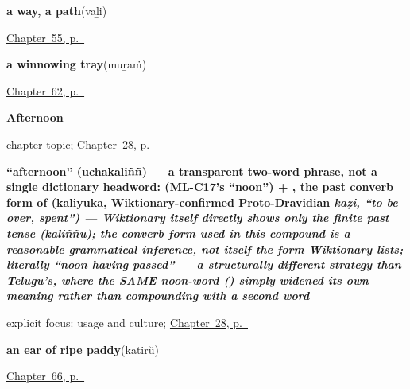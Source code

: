 \noindent\begin{minipage}[t]{\linewidth}
\raggedright
\textbf{a way, a path}\enspace\emph{}\enspace(vaḻi)\par
\footnotesize \hyperref[ch:ml-ground-underfoot]{Chapter~55, p.~\pageref*{ch:ml-ground-underfoot}}
\end{minipage}\par\smallskip

\noindent\begin{minipage}[t]{\linewidth}
\raggedright
\textbf{a winnowing tray}\enspace\emph{}\enspace(muṟaṁ)\par
\footnotesize \hyperref[ch:ml-made-by-hand]{Chapter~62, p.~\pageref*{ch:ml-made-by-hand}}
\end{minipage}\par\smallskip

\noindent\begin{minipage}[t]{\linewidth}
\raggedright
\textbf{Afternoon}\par
\footnotesize chapter topic; \hyperref[ch:ml-afternoon]{Chapter~28, p.~\pageref*{ch:ml-afternoon}}
\end{minipage}\par\smallskip

\noindent\begin{minipage}[t]{\linewidth}
\raggedright
\textbf{\textquotedblleft{}afternoon\textquotedblright{} (uchakaḻiññ) — a transparent two-word phrase, not a single dictionary headword:  (ML-C17's \textquotedblleft{}noon\textquotedblright{}) + , the past converb form of  (kaḻiyuka, Wiktionary-confirmed Proto-Dravidian \emph{kaẓi, \textquotedblleft{}to be over, spent\textquotedblright{}) — Wiktionary itself directly shows only the finite past tense  (kaḻiññu); the converb form used in this compound is a reasonable grammatical inference, not itself the form Wiktionary lists; literally \textquotedblleft{}noon having passed\textquotedblright{} — a structurally different strategy than Telugu's, where the SAME noon-word () simply widened its own meaning rather than compounding with a second word}}\enspace\emph{}\par
\footnotesize explicit focus: usage and culture; \hyperref[ch:ml-afternoon]{Chapter~28, p.~\pageref*{ch:ml-afternoon}}
\end{minipage}\par\smallskip

\noindent\begin{minipage}[t]{\linewidth}
\raggedright
\textbf{an ear of ripe paddy}\enspace\emph{}\enspace(katirŭ)\par
\footnotesize \hyperref[ch:ml-out-in-the-paddy]{Chapter~66, p.~\pageref*{ch:ml-out-in-the-paddy}}
\end{minipage}\par\smallskip


